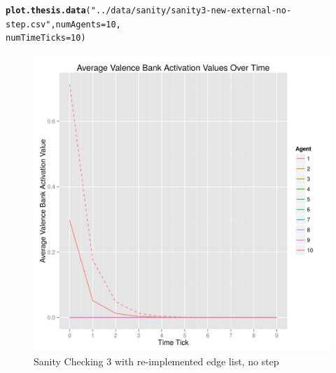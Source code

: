 \documentclass{article}\usepackage[]{graphicx}\usepackage[]{color}
\makeatletter
\def\maxwidth{ %
  \ifdim\Gin@nat@width>\linewidth
    \linewidth
  \else
    \Gin@nat@width
  \fi
}
\newcommand{\hlnum}[1]{\textcolor[rgb]{0.686,0.059,0.569}{#1}}%
\newcommand{\hlstr}[1]{\textcolor[rgb]{0.192,0.494,0.8}{#1}}%
\newcommand{\hlstd}[1]{\textcolor[rgb]{0.345,0.345,0.345}{#1}}%
\newcommand{\hlkwc}[1]{\textcolor[rgb]{0.333,0.667,0.333}{#1}}%
\newcommand{\hlkwd}[1]{\textcolor[rgb]{0.737,0.353,0.396}{\textbf{#1}}}%
\newenvironment{kframe}{%
 \def\at@end@of@kframe{}%
 \ifinner\ifhmode%
  \def\at@end@of@kframe{\end{minipage}}%
  \begin{minipage}{\columnwidth}%
 \fi\fi%
 \def\FrameCommand##1{\hskip\@totalleftmargin \hskip-\fboxsep
 \colorbox{shadecolor}{##1}\hskip-\fboxsep
     \hskip-\linewidth \hskip-\@totalleftmargin \hskip\columnwidth}%
 \MakeFramed {\advance\hsize-\width
   \@totalleftmargin\z@ \linewidth\hsize
   \@setminipage}}%
 {\par\unskip\endMakeFramed%
 \at@end@of@kframe}
\newenvironment{knitrout}{}{} %
\makeatother
\begin{document}
\newpage
\begin{knitrout}
\color{fgcolor}\begin{kframe}
\begin{alltt}
\hlkwd{plot.thesis.data}\hlstd{(}\hlstr{"../data/sanity/sanity3-new-external-no-step.csv"}\hlstd{,} \hlkwc{numAgents} \hlstd{=} \hlnum{10}\hlstd{,}
    \hlkwc{numTimeTicks} \hlstd{=} \hlnum{10}\hlstd{)}
\end{alltt}
\end{kframe}\begin{figure}[]

\includegraphics[width=\maxwidth]{figure/plot-sanity-3-v2-nostep} \caption[Sanity Checking 3 with re-implemented edge list, no step]{Sanity Checking 3 with re-implemented edge list, no step\label{fig:plot-sanity-3-v2-nostep}}
\end{figure}


\end{knitrout}


\newpage
\end{document}
